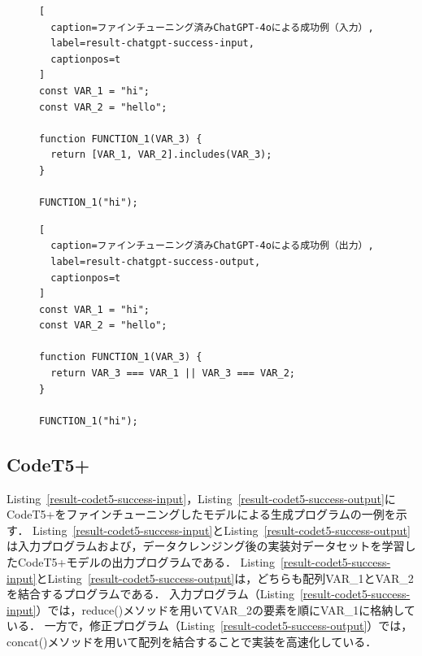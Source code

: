 \documentclass[11pt]{jreport}
\begin{document}
\begin{figure}[t]
\captionsetup{name=Listing}
\hspace{0.04\columnwidth}
\begin{minipage}[b]{0.96\linewidth}
\begin{lstlisting}[
  caption=ファインチューニング済みChatGPT-4oによる成功例（入力）,
  label=result-chatgpt-success-input,
  captionpos=t
]
const VAR_1 = "hi";
const VAR_2 = "hello";

function FUNCTION_1(VAR_3) {
  return [VAR_1, VAR_2].includes(VAR_3);
}

FUNCTION_1("hi");
\end{lstlisting}
\end{minipage}

\hspace{0.04\columnwidth}
\begin{minipage}[b]{0.96\linewidth}
\begin{lstlisting}[
  caption=ファインチューニング済みChatGPT-4oによる成功例（出力）,
  label=result-chatgpt-success-output,
  captionpos=t
]
const VAR_1 = "hi";
const VAR_2 = "hello";

function FUNCTION_1(VAR_3) {
  return VAR_3 === VAR_1 || VAR_3 === VAR_2;
}

FUNCTION_1("hi");
\end{lstlisting}
\end{minipage}
\end{figure}




\subsection{CodeT5+}


Listing~\ref{result-codet5-success-input}，Listing~\ref{result-codet5-success-output}にCodeT5+をファインチューニングしたモデルによる生成プログラムの一例を示す．
Listing~\ref{result-codet5-success-input}とListing~\ref{result-codet5-success-output}は入力プログラムおよび，データクレンジング後の実装対データセットを学習したCodeT5+モデルの出力プログラムである．
Listing~\ref{result-codet5-success-input}とListing~\ref{result-codet5-success-output}は，どちらも配列VAR\_1とVAR\_2を結合するプログラムである．
入力プログラム（Listing~\ref{result-codet5-success-input}）では，reduce()メソッドを用いてVAR\_2の要素を順にVAR\_1に格納している．
一方で，修正プログラム（Listing~\ref{result-codet5-success-output}）では，concat()メソッドを用いて配列を結合することで実装を高速化している．
\end{document}
